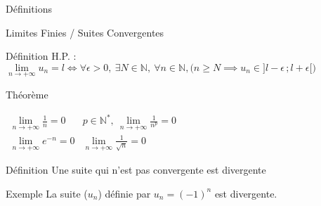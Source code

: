 \documentclass{cours}
\begin{document}
\begin{Gpartie}{Définitions}
\begin{Spartie}{Limites Finies / Suites Convergentes}
\begin{SSpartie}{Définition}
                H.P. : $\lim\limits_{n\to +\infty} u_n=l\iff\forall\epsilon >0,\ \exists N\in\mathbb{N},\ \forall n\in\mathbb{N}, \Big(n\geq N\implies u_n\in\big]l-\epsilon\,;l+\epsilon\big[\Big)$
            \end{SSpartie}
            \begin{SSpartie}{Théorème} 
                \begin{center}$\begin{array}{cc}
                    \lim\limits_{n\to +\infty}\frac{1}{n}=0 & p\in\mathbb{N^*},\ \lim\limits_{n\to +\infty}\frac{1}{n^p}=0 \\
                    \lim\limits_{n\to +\infty}e^{-n}=0 & \lim\limits_{n\to +\infty}\frac{1}{\sqrt{n}}=0
                \end{array}$\end{center}
            \end{SSpartie}
            \begin{SSpartie}{Définition} 
                Une suite qui n'est pas convergente est divergente
            \end{SSpartie}
            \begin{SSpartie}{Exemple} 
                La suite ($u_n$) définie par $u_n=(-1)^n$ est divergente.
            \end{SSpartie}
        \end{Spartie}
    \end{Gpartie}
\end{document}
